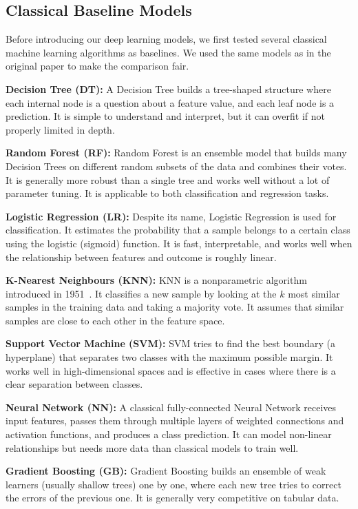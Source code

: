 \documentclass[10pt, twocolumn]{article}
\begin{document}
\subsection{Classical Baseline Models}

Before introducing our deep learning models, we first tested several classical machine
learning algorithms as baselines. We used the same models as in the original paper to make
the comparison fair.

\textbf{Decision Tree (DT):}
A Decision Tree builds a tree-shaped structure where each internal node is a question about
a feature value, and each leaf node is a prediction. It is simple to understand and interpret,
but it can overfit if not properly limited in depth.

\textbf{Random Forest (RF):}
Random Forest is an ensemble model that builds many Decision Trees on different random subsets
of the data and combines their votes. It is generally more robust than a single tree and
works well without a lot of parameter tuning. It is applicable to both classification and
regression tasks.

\textbf{Logistic Regression (LR):}
Despite its name, Logistic Regression is used for classification. It estimates the probability
that a sample belongs to a certain class using the logistic (sigmoid) function. It is fast,
interpretable, and works well when the relationship between features and outcome is roughly linear.

\textbf{K-Nearest Neighbours (KNN):}
KNN is a nonparametric algorithm introduced in 1951~\cite{fix1989}. It classifies a new
sample by looking at the $k$ most similar samples in the training data and taking a majority
vote. It assumes that similar samples are close to each other in the feature space.

\textbf{Support Vector Machine (SVM):}
SVM tries to find the best boundary (a hyperplane) that separates two classes with the
maximum possible margin. It works well in high-dimensional spaces and is effective in cases
where there is a clear separation between classes.

\textbf{Neural Network (NN):}
A classical fully-connected Neural Network receives input features, passes them through
multiple layers of weighted connections and activation functions, and produces a class
prediction. It can model non-linear relationships but needs more data than classical models
to train well.

\textbf{Gradient Boosting (GB):}
Gradient Boosting builds an ensemble of weak learners (usually shallow trees) one by one,
where each new tree tries to correct the errors of the previous one. It is generally very
competitive on tabular data.
\end{document}
